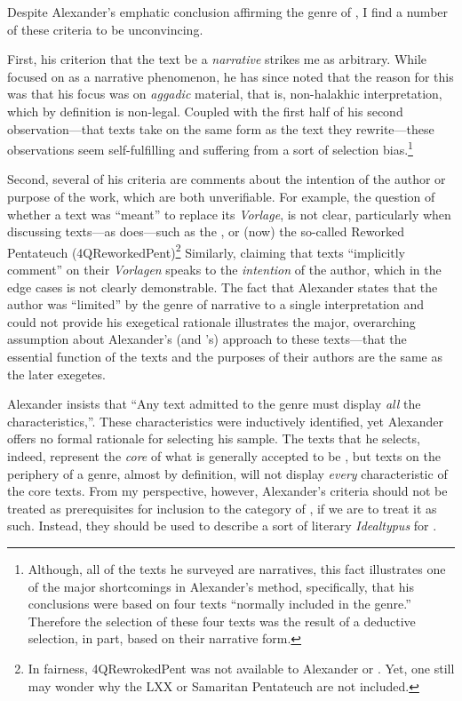  Despite Alexander's emphatic conclusion affirming the genre of \RwB, I find a number of these criteria to be unconvincing. 

 First, his criterion that the text be a \emph{narrative} strikes me as arbitrary. While \vermes focused on \rwb as a narrative phenomenon, he has since noted that the reason for this was that his focus was on \emph{aggadic} material, that is, non-halakhic interpretation, which by definition is non-legal. Coupled with the first half of his second observation---that \rwb texts take on the same form as the text they rewrite---these observations seem self-fulfilling and suffering from a sort of selection bias.\footnote{Although,   all of the texts he surveyed are narratives, this fact illustrates one   of the major shortcomings in Alexander's method, specifically, that   his conclusions were based on four texts ``normally included in the   genre.''\autocite[99]{alexander_carson-williamson1988} Therefore the   selection of these four texts was the result of a deductive selection,   in part, based on their narrative form.} 

 Second, several of his criteria are comments about the intention of the author or purpose of the work, which are both unverifiable. For example, the question of whether a \rwb text was ``meant'' to replace its \emph{Vorlage}, is not clear, particularly when discussing texts---as \vermes does---such as the \pTarg, or (now) the so-called Reworked Pentateuch (4QReworkedPent)\footnote{In fairness, 4QRewrokedPent was not available   to Alexander or \vermes. Yet, one still may wonder why   the LXX or Samaritan Pentateuch are not included.} Similarly, claiming that \rwb texts ``implicitly comment'' on their \emph{Vorlagen} speaks to the \emph{intention} of the author, which in the edge cases is not clearly demonstrable. The fact that Alexander states that the author was ``limited'' by the genre of narrative to a single interpretation and could not provide his exegetical rationale illustrates the major, overarching assumption about Alexander's (and \vermes's) approach to these texts---that the essential function of the texts and the purposes of their authors are the same as the later exegetes. 

 Alexander insists that ``Any text admitted to the genre must display \emph{all} the characteristics,''\autocite[119 n. 11]{alexander_carson-williamson1988}. These characteristics were inductively identified, yet Alexander offers no formal rationale for selecting his sample. The texts that he selects, indeed, represent the \emph{core} of what is generally accepted to be \rwb, but texts on the periphery of a genre, almost by definition, will not display \emph{every} characteristic of the core texts. From my perspective, however, Alexander's criteria should not be treated as prerequisites for inclusion to the category of \rwb, if we are to treat it as such. Instead, they should be used to describe a sort of literary \emph{Idealtypus} for \rwb. 

